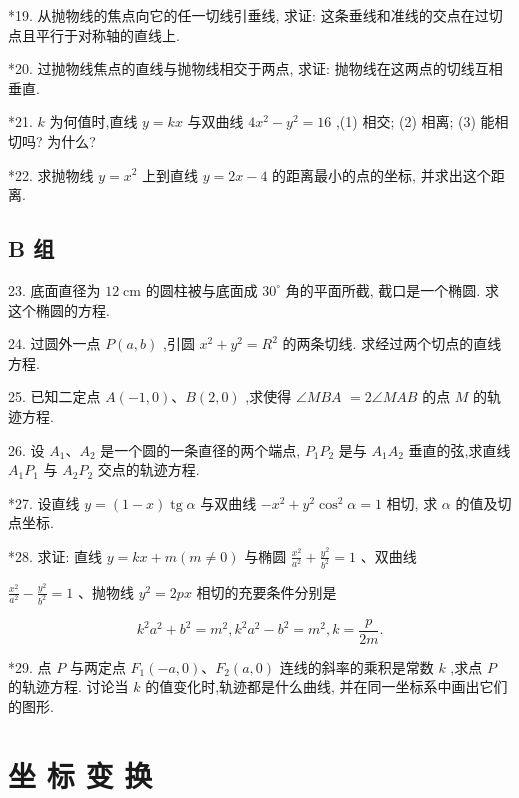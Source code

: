 \documentclass[lang=cn,newtx,10pt,scheme=chinese]{elegantbook}
\begin{document}
*19. 从抛物线的焦点向它的任一切线引垂线, 求证: 这条垂线和准线的交点在过切点且平行于对称轴的直线上.

*20. 过抛物线焦点的直线与抛物线相交于两点, 求证: 抛物线在这两点的切线互相垂直.

*21. \(k\) 为何值时,直线 \(y = {kx}\) 与双曲线 \(4{x}^{2} - {y}^{2} = {16}\) ,(1) 相交; (2) 相离; (3) 能相切吗? 为什么?

*22. 求抛物线 \(y = {x}^{2}\) 上到直线 \(y = {2x} - 4\) 的距离最小的点的坐标, 并求出这个距离.

\section*{B 组}

23. 底面直径为 \({12}\mathrm{\;{cm}}\) 的圆柱被与底面成 \({30}^{ \circ }\) 角的平面所截, 截口是一个椭圆. 求这个椭圆的方程.

24. 过圆外一点 \(P\left( {a,b}\right)\) ,引圆 \({x}^{2} + {y}^{2} = {R}^{2}\) 的两条切线. 求经过两个切点的直线方程.

25. 已知二定点 \(A\left( {-1,0}\right) \text{、}B\left( {2,0}\right)\) ,求使得 \(\angle {MBA}\) \(= 2\angle {MAB}\) 的点 \(M\) 的轨迹方程.

26. 设 \({A}_{1}\text{、}{A}_{2}\) 是一个圆的一条直径的两个端点, \({P}_{1}{P}_{2}\) 是与 \({A}_{1}{A}_{2}\) 垂直的弦,求直线 \({A}_{1}{P}_{1}\) 与 \({A}_{2}{P}_{2}\) 交点的轨迹方程.

*27. 设直线 \(y = \left( {1 - x}\right) \operatorname{tg}\alpha\) 与双曲线 \(- {x}^{2} + {y}^{2}{\cos }^{2}\alpha = 1\) 相切, 求 \(\alpha\) 的值及切点坐标.

*28. 求证: 直线 \(y = {kx} + m\left( {m \neq 0}\right)\) 与椭圆 \(\frac{{x}^{2}}{{a}^{2}} + \frac{{y}^{2}}{{b}^{2}} = 1\) 、双曲线

\(\frac{{x}^{2}}{{a}^{2}} - \frac{{y}^{2}}{{b}^{2}} = 1\) 、抛物线 \({y}^{2} = {2px}\) 相切的充要条件分别是

\[
    {k}^{2}{a}^{2} + {b}^{2} = {m}^{2},{k}^{2}{a}^{2} - {b}^{2} = {m}^{2},k = \frac{p}{2m}.
\]

*29. 点 \(P\) 与两定点 \({F}_{1}\left( {-a,0}\right) \text{、}{F}_{2}\left( {a,0}\right)\) 连线的斜率的乘积是常数 \(k\) ,求点 \(P\) 的轨迹方程. 讨论当 \(k\) 的值变化时,轨迹都是什么曲线, 并在同一坐标系中画出它们的图形.

\chapter{坐 标 变 换}
\end{document}
